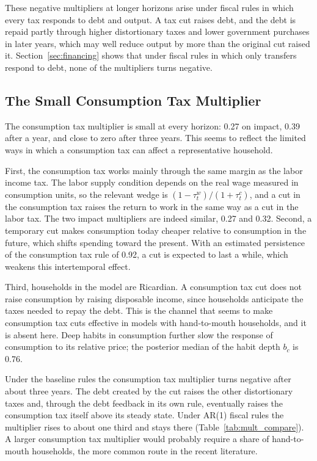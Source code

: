 \documentclass[article,11pt,letterpaper,fleqn]{article}
\theoremstyle{definition}
\numberwithin{equation}{section}
\begin{document}
These negative multipliers at longer horizons arise under fiscal rules in which every tax responds to debt and output. A tax cut raises debt, and the debt is repaid partly through higher distortionary taxes and lower government purchases in later years, which may well reduce output by more than the original cut raised it. Section~\ref{sec:financing} shows that under fiscal rules in which only transfers respond to debt, none of the multipliers turns negative.

\subsection{The Small Consumption Tax Multiplier}
\label{sec:small_ctax}

The consumption tax multiplier is small at every horizon: 0.27 on impact, 0.39 after a year, and close to zero after three years. This seems to reflect the limited ways in which a consumption tax can affect a representative household.

First, the consumption tax works mainly through the same margin as the labor income tax. The labor supply condition depends on the real wage measured in consumption units, so the relevant wedge is $(1-\tau_t^w)/(1+\tau_t^c)$, and a cut in the consumption tax raises the return to work in the same way as a cut in the labor tax. The two impact multipliers are indeed similar, 0.27 and 0.32. Second, a temporary cut makes consumption today cheaper relative to consumption in the future, which shifts spending toward the present. With an estimated persistence of the consumption tax rule of 0.92, a cut is expected to last a while, which weakens this intertemporal effect.

Third, households in the model are Ricardian. A consumption tax cut does not raise consumption by raising disposable income, since households anticipate the taxes needed to repay the debt. This is the channel that seems to make consumption tax cuts effective in models with hand-to-mouth households, and it is absent here. Deep habits in consumption further slow the response of consumption to its relative price; the posterior median of the habit depth $b_c$ is 0.76.

Under the baseline rules the consumption tax multiplier turns negative after about three years. The debt created by the cut raises the other distortionary taxes and, through the debt feedback in its own rule, eventually raises the consumption tax itself above its steady state. Under AR(1) fiscal rules the multiplier rises to about one third and stays there (Table~\ref{tab:mult_compare}). A larger consumption tax multiplier would probably require a share of hand-to-mouth households, the more common route in the recent literature.
\end{document}
